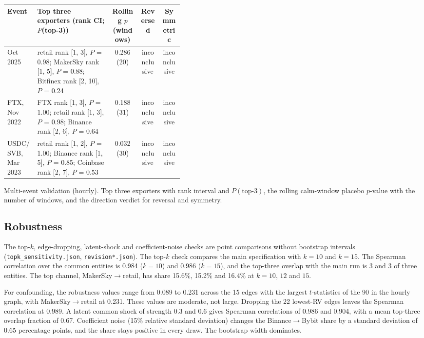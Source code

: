 \documentclass[referee,pdflatex,sn-mathphys-ay]{sn-jnl}
\newcommand{\fitbox}{\ifdim\wd\tabbox>\linewidth\resizebox{\linewidth}{!}{\usebox{\tabbox}}\else\usebox{\tabbox}\fi}%
\theoremstyle{thmstyleone}%
\theoremstyle{thmstyletwo}%
\theoremstyle{thmstylethree}%
\begin{document}
\begin{lrbox}{\tabbox}\footnotesize\setlength{\tabcolsep}{3pt}%
\begin{tabular}{@{}lp{0.42\linewidth}ccc@{}}
\toprule
\textbf{Event} & \textbf{Top three exporters (rank CI; $P$(top-3))} & \textbf{Rolling $p$ (windows)} & \textbf{Reversed} & \textbf{Symmetric}\\
\midrule
Oct 2025 & retail rank [1, 3], $P$ = 0.98; MakerSky rank [1, 5], $P$ = 0.88; Bitfinex rank [2, 10], $P$ = 0.24 & 0.286 (20) & inconclusive & inconclusive \\
FTX, Nov 2022 & FTX rank [1, 3], $P$ = 1.00; retail rank [1, 3], $P$ = 0.98; Binance rank [2, 6], $P$ = 0.64 & 0.188 (31) & inconclusive & inconclusive \\
USDC/SVB, Mar 2023 & retail rank [1, 2], $P$ = 1.00; Binance rank [1, 5], $P$ = 0.85; Coinbase rank [2, 7], $P$ = 0.53 & 0.032 (30) & inconclusive & inconclusive \\
\bottomrule
\end{tabular}
\end{lrbox}
\begin{tableorg}[tbp]
\centering
\caption{Multi-event validation (hourly). Top three exporters with rank interval and $P(\text{top-3})$, the rolling
calm-window placebo $p$-value with the number of windows, and the direction verdict for reversal and symmetry.}
\label{tab:events}
\fitbox
\end{tableorg}

\subsection{Robustness}
\label{subsec:robustness}
The top-$k$, edge-dropping, latent-shock and coefficient-noise checks are point comparisons without bootstrap intervals
(\texttt{topk\_sensitivity.json}, \texttt{revision*.json}). The top-$k$ check compares the main specification with $k=10$ and $k=15$. The Spearman correlation over the common entities is
0.984 ($k=10$) and 0.986 ($k=15$), and the top-three overlap with the main run is 3 and 3 of three entities. The top channel,
MakerSky$\to$retail, has share 15.6\%, 15.2\% and 16.4\% at $k=10$, $12$ and $15$.

For confounding, the robustness values range from 0.089 to 0.231 across the 15 edges with the largest $t$-statistics of the 90 in the hourly graph, with
MakerSky$\to$retail at 0.231. These values are moderate, not large. Dropping the 22 lowest-RV edges leaves the Spearman
correlation at 0.989. A latent common shock of strength 0.3 and 0.6 gives Spearman correlations of 0.986 and 0.904,
with a mean top-three overlap fraction of 0.67. Coefficient noise (15\% relative standard deviation) changes the Binance$\to$Bybit share
by a standard deviation of 0.65 percentage points, and the share stays positive in every draw. The bootstrap width dominates.
\end{document}

